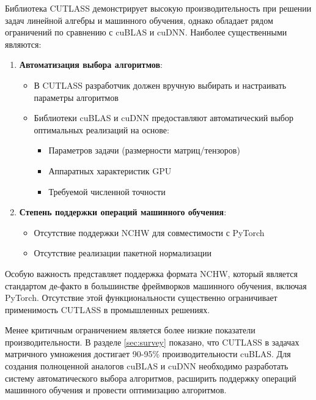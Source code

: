 Библиотека CUTLASS демонстрирует высокую производительность при решении задач линейной алгебры и машинного обучения, однако обладает рядом
ограничений по сравнению с cuBLAS и cuDNN. Наиболее существенными являются:
\begin{enumerate}
\item \textbf{Автоматизация выбора алгоритмов}:
\begin{itemize}
\item В CUTLASS разработчик должен вручную выбирать и настраивать параметры алгоритмов
\item Библиотеки cuBLAS и cuDNN предоставляют автоматический выбор оптимальных реализаций на основе:
\begin{itemize}
\item Параметров задачи (размерности матриц/тензоров)
\item Аппаратных характеристик GPU
\item Требуемой численной точности
\end{itemize}
\end{itemize}

\item \textbf{Степень поддержки операций машинного обучения}:
    \begin{itemize}
    \item Отсутствие поддержки NCHW для совместимости с PyTorch
    \item Отсутствие реализации пакетной нормализации
    \end{itemize}
\end{enumerate}

Особую важность представляет поддержка формата NCHW, который является стандартом де-факто в большинстве фреймворков машинного обучения, включая PyTorch.
Отсутствие этой функциональности существенно ограничивает применимость CUTLASS в промышленных решениях.

Менее критичным ограничением является более низкие показатели производительности. В разделе \ref{sec:survey} показано, что CUTLASS в задачах матричного умножения
достигает 90-95\% производительности cuBLAS. Для создания полноценной аналогов cuBLAS и cuDNN необходимо разработать систему автоматического выбора алгоритмов,
расширить поддержку операций машинного обучения и провести оптимизацию алгоритмов.